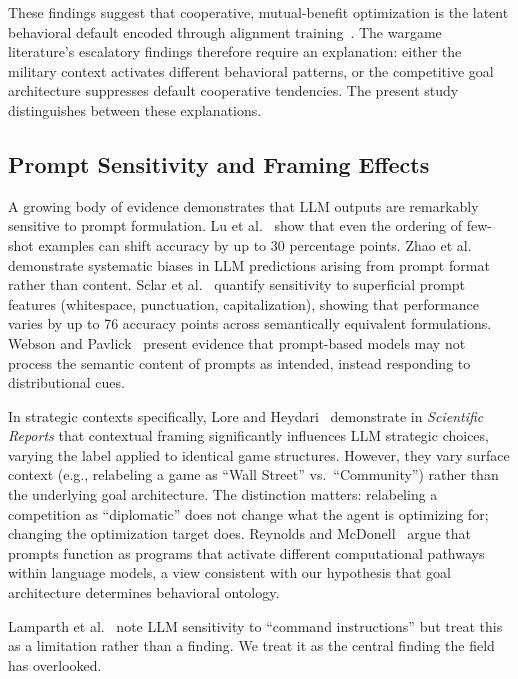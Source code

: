 \documentclass[manuscript, review=true, anonymous=true]{acmart}
\begin{document}
These findings suggest that cooperative, mutual-benefit optimization is the latent behavioral default encoded through alignment training~\cite{ouyang2022training,christiano2017deep}.
The wargame literature's escalatory findings therefore require an explanation: either the military context activates different behavioral patterns, or the competitive goal architecture suppresses default cooperative tendencies.
The present study distinguishes between these explanations.

\subsection{Prompt Sensitivity and Framing Effects}

A growing body of evidence demonstrates that LLM outputs are remarkably sensitive to prompt formulation.
Lu et al.~\cite{lu2022fantastically} show that even the ordering of few-shot examples can shift accuracy by up to 30 percentage points.
Zhao et al.~\cite{zhao2021calibrate} demonstrate systematic biases in LLM predictions arising from prompt format rather than content.
Sclar et al.~\cite{sclar2024quantifying} quantify sensitivity to superficial prompt features (whitespace, punctuation, capitalization), showing that performance varies by up to 76 accuracy points across semantically equivalent formulations.
Webson and Pavlick~\cite{webson2022prompt} present evidence that prompt-based models may not process the semantic content of prompts as intended, instead responding to distributional cues.

In strategic contexts specifically, Lore and Heydari~\cite{lore2024strategic} demonstrate in \emph{Scientific Reports} that contextual framing significantly influences LLM strategic choices, varying the label applied to identical game structures.
However, they vary surface context (e.g., relabeling a game as ``Wall Street'' vs.\ ``Community'') rather than the underlying goal architecture.
The distinction matters: relabeling a competition as ``diplomatic'' does not change what the agent is optimizing for; changing the optimization target does.
Reynolds and McDonell~\cite{reynolds2021prompt} argue that prompts function as programs that activate different computational pathways within language models, a view consistent with our hypothesis that goal architecture determines behavioral ontology.

Lamparth et al.~\cite{lamparth2024human} note LLM sensitivity to ``command instructions'' but treat this as a limitation rather than a finding.
We treat it as the central finding the field has overlooked.
\end{document}
